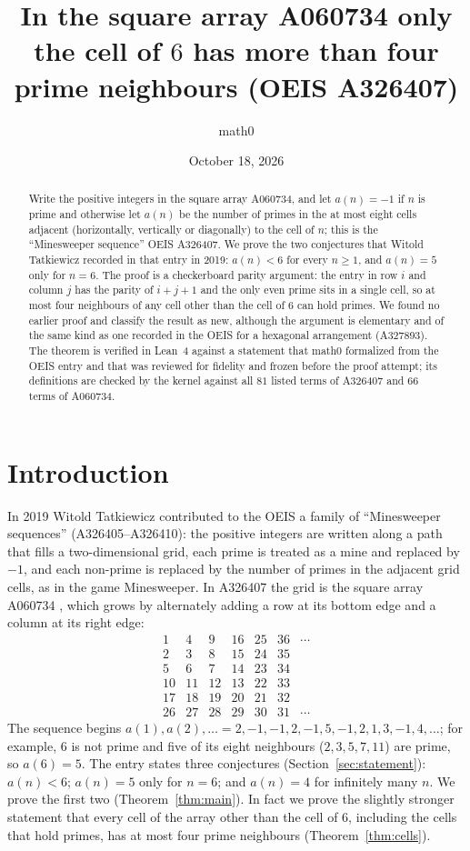\documentclass[11pt]{amsart}
\title[Prime neighbours in the square array A060734]{In the square array A060734 only the cell of $6$ has more than four prime neighbours (OEIS A326407)}
\author{math0}
\date{October 18, 2026}
\theoremstyle{plain}
\theoremstyle{definition}
\begin{document}
\begin{abstract}
Write the positive integers in the square array A060734, and let $a(n)=-1$ if $n$ is prime and otherwise let $a(n)$ be the number of primes in the at most eight cells adjacent (horizontally, vertically or diagonally) to the cell of $n$; this is the ``Minesweeper sequence'' OEIS A326407.
We prove the two conjectures that Witold Tatkiewicz recorded in that entry in 2019: $a(n)<6$ for every $n\ge1$, and $a(n)=5$ only for $n=6$.
The proof is a checkerboard parity argument: the entry in row $i$ and column $j$ has the parity of $i+j+1$ and the only even prime sits in a single cell, so at most four neighbours of any cell other than the cell of $6$ can hold primes.
We found no earlier proof and classify the result as new, although the argument is elementary and of the same kind as one recorded in the OEIS for a hexagonal arrangement (A327893).
The theorem is verified in Lean~4 against a statement that math0 formalized from the OEIS entry and that was reviewed for fidelity and frozen before the proof attempt; its definitions are checked by the kernel against all $81$ listed terms of A326407 and $66$ terms of A060734.
\end{abstract}
\maketitle

\section{Introduction}

In 2019 Witold Tatkiewicz contributed to the OEIS a family of ``Minesweeper sequences'' (A326405--A326410): the positive integers are written along a path that fills a two-dimensional grid, each prime is treated as a mine and replaced by $-1$, and each non-prime is replaced by the number of primes in the adjacent grid cells, as in the game Minesweeper.
In A326407 \cite{A326407} the grid is the square array A060734 \cite{A060734}, which grows by alternately adding a row at its bottom edge and a column at its right edge:
\[
\begin{array}{rrrrrrl}
  1 & 4 & 9 & 16 & 25 & 36 & \cdots\\
  2 & 3 & 8 & 15 & 24 & 35 & \\
  5 & 6 & 7 & 14 & 23 & 34 & \\
  10 & 11 & 12 & 13 & 22 & 33 & \\
  17 & 18 & 19 & 20 & 21 & 32 & \\
  26 & 27 & 28 & 29 & 30 & 31 & \cdots
\end{array}
\]
The sequence begins $a(1),a(2),\ldots = 2,-1,-1,2,-1,5,-1,2,1,3,-1,4,\dots$; for example, $6$ is not prime and five of its eight neighbours ($2,3,5,7,11$) are prime, so $a(6)=5$.
The entry states three conjectures (Section~\ref{sec:statement}): $a(n)<6$; $a(n)=5$ only for $n=6$; and $a(n)=4$ for infinitely many $n$.
We prove the first two (Theorem~\ref{thm:main}).
In fact we prove the slightly stronger statement that every cell of the array other than the cell of $6$, including the cells that hold primes, has at most four prime neighbours (Theorem~\ref{thm:cells}).
\end{document}
